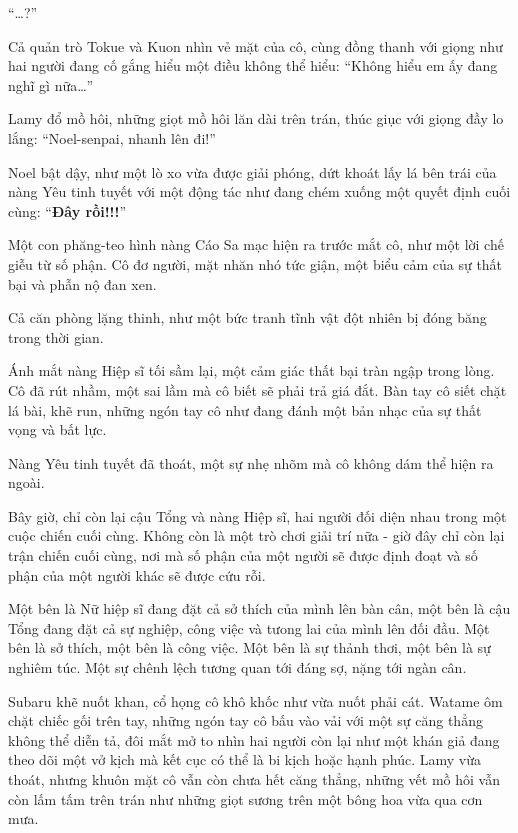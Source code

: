 \documentclass[../main.tex]{subfiles}
\begin{document}
``\dots?''

Cả quản trò Tokue và Kuon nhìn vẻ mặt của cô, cùng đồng thanh với giọng như hai người đang cố gắng hiểu một điều không thể hiểu: ``Không hiểu em ấy đang nghĩ gì nữa\dots''

Lamy đổ mồ hôi, những giọt mồ hôi lăn dài trên trán, thúc giục với giọng đầy lo lắng: ``Noel-senpai, nhanh lên đi!''

Noel bật dậy, như một lò xo vừa được giải phóng, dứt khoát lấy lá bên trái của nàng Yêu tinh tuyết với một động tác như đang chém xuống một quyết định cuối cùng: ``\textbf{Đây rồi!!!}''

Một con phăng-teo hình nàng Cáo Sa mạc hiện ra trước mắt cô, như một lời chế giễu từ số phận. Cô đơ người, mặt nhăn nhó tức giận, một biểu cảm của sự thất bại và phẫn nộ đan xen.


Cả căn phòng lặng thinh, như một bức tranh tĩnh vật đột nhiên bị đóng băng trong thời gian.

Ánh mắt nàng Hiệp sĩ tối sầm lại, một cảm giác thất bại tràn ngập trong lòng. Cô đã rút nhầm, một sai lầm mà cô biết sẽ phải trả giá đắt. Bàn tay cô siết chặt lá bài, khẽ run, những ngón tay cô như đang đánh một bản nhạc của sự thất vọng và bất lực.

Nàng Yêu tinh tuyết đã thoát, một sự nhẹ nhõm mà cô không dám thể hiện ra ngoài.

Bây giờ, chỉ còn lại cậu Tổng và nàng Hiệp sĩ, hai người đối diện nhau trong một cuộc chiến cuối cùng. Không còn là một trò chơi giải trí nữa - giờ đây chỉ còn lại trận chiến cuối cùng, nơi mà số phận của một người sẽ được định đoạt và số phận của một người khác sẽ được cứu rỗi.

Một bên là Nữ hiệp sĩ đang đặt cả sở thích của mình lên bàn cân, một bên là cậu Tổng đang đặt cả sự nghiệp, công việc và tưong lai của mình lên đối đầu. Một bên là sở thích, một bên là công việc. Một bên là sự thảnh thơi, một bên là sự nghiêm túc. Một sự chênh lệch tương quan tới đáng sợ, nặng tới ngàn cân.

Subaru khẽ nuốt khan, cổ họng cô khô khốc như vừa nuốt phải cát. Watame ôm chặt chiếc gối trên tay, những ngón tay cô bấu vào vải với một sự căng thẳng không thể diễn tả, đôi mắt mở to nhìn hai người còn lại như một khán giả đang theo dõi một vở kịch mà kết cục có thể là bi kịch hoặc hạnh phúc. Lamy vừa thoát, nhưng khuôn mặt cô vẫn còn chưa hết căng thẳng, những vết mồ hôi vẫn còn lấm tấm trên trán như những giọt sương trên một bông hoa vừa qua cơn mưa.
\end{document}
